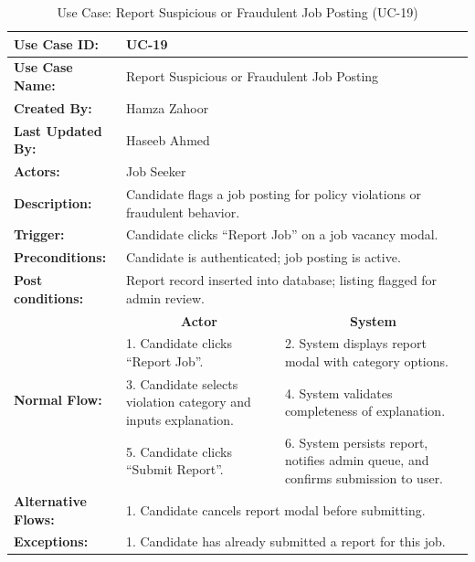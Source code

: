 \begin{table}[H]
\centering
\small
\caption{Use Case: Report Suspicious or Fraudulent Job Posting (UC-19)}
\label{tab:uc19_spec}
\begin{tabular}{|p{3.2cm}|p{5.5cm}|p{5.5cm}|}
\hline
\textbf{Use Case ID:} & \multicolumn{2}{p{11.4cm}|}{UC-19} \\ \hline
\textbf{Use Case Name:} & \multicolumn{2}{p{11.4cm}|}{Report Suspicious or Fraudulent Job Posting} \\ \hline
\textbf{Created By:} & \multicolumn{2}{p{11.4cm}|}{Hamza Zahoor} \\ \hline
\textbf{Last Updated By:} & \multicolumn{2}{p{11.4cm}|}{Haseeb Ahmed} \\ \hline
\textbf{Actors:} & \multicolumn{2}{p{11.4cm}|}{Job Seeker} \\ \hline
\textbf{Description:} & \multicolumn{2}{p{11.4cm}|}{Candidate flags a job posting for policy violations or fraudulent behavior.} \\ \hline
\textbf{Trigger:} & \multicolumn{2}{p{11.4cm}|}{Candidate clicks ``Report Job'' on a job vacancy modal.} \\ \hline
\textbf{Preconditions:} & \multicolumn{2}{p{11.4cm}|}{Candidate is authenticated; job posting is active.} \\ \hline
\textbf{Post conditions:} & \multicolumn{2}{p{11.4cm}|}{Report record inserted into database; listing flagged for admin review.} \\ \hline
\multirow{4}{*}{\textbf{Normal Flow:}} & \multicolumn{1}{c|}{\textbf{Actor}} & \multicolumn{1}{c|}{\textbf{System}} \\ \cline{2-3}
& 1. Candidate clicks ``Report Job''. & 2. System displays report modal with category options. \vspace{2pt} \\
& 3. Candidate selects violation category and inputs explanation. & 4. System validates completeness of explanation. \vspace{2pt} \\
& 5. Candidate clicks ``Submit Report''. & 6. System persists report, notifies admin queue, and confirms submission to user. \\ \hline
\textbf{Alternative Flows:} & \multicolumn{2}{p{11.4cm}|}{1. Candidate cancels report modal before submitting.} \\ \hline
\textbf{Exceptions:} & \multicolumn{2}{p{11.4cm}|}{1. Candidate has already submitted a report for this job.} \\ \hline
\end{tabular}
\end{table}

